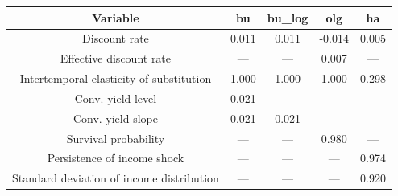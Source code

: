 \begin{table}[!ht]
\setlength\tabcolsep{0.425em}
\setlength\aboverulesep{0pt}
\setlength\belowrulesep{0.2em}
\centering
\begin{threeparttable}
\begin{tabular}{ccccc}
\toprule[0.1em]
Variable & bu & bu\_log & olg & ha \\[0.2em]
\midrule[0.075em]
Discount rate & 0.011 & 0.011 & -0.014 & 0.005 \\[0.2em]
Effective discount rate & --- & --- & 0.007 & --- \\[0.2em]
Intertemporal elasticity of substitution & 1.000 & 1.000 & 1.000 & 0.298 \\[0.2em]
Conv. yield level & 0.021 & --- & --- & --- \\[0.2em]
Conv. yield slope & 0.021 & 0.021 & --- & --- \\[0.2em]
Survival probability & --- & --- & 0.980 & --- \\[0.2em]
Persistence of income shock & --- & --- & --- & 0.974 \\[0.2em]
Standard deviation of income distribution & --- & --- & --- & 0.920 \\[0.2em]
\bottomrule[0.1em]
\end{tabular}
\end{threeparttable}
\end{table}
